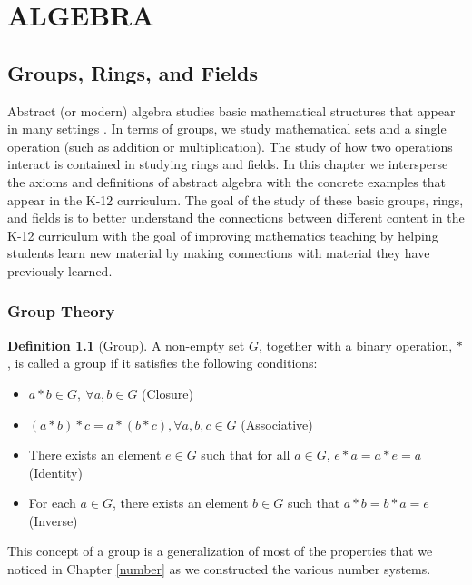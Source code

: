 \documentclass[
]{book}
\let\stdsection\section
\renewcommand\section{\newpage\stdsection}
\theoremstyle{definition}
\newtheorem{definition}{Definition}[chapter]
\theoremstyle{definition}
\theoremstyle{definition}
\theoremstyle{definition}
\theoremstyle{remark}
\begin{document}
\hypertarget{part-algebra}{%
\part{ALGEBRA}\label{part-algebra}}

\hypertarget{group-1}{%
\chapter{Groups, Rings, and Fields}\label{group-1}}

Abstract (or modern) algebra studies basic mathematical structures that appear in many settings . In terms of groups, we study mathematical sets and a single operation (such as addition or multiplication). The study of how two operations interact is contained in studying rings and fields. In this chapter we intersperse the axioms and definitions of abstract algebra with the concrete examples that appear in the K-12 curriculum. The goal of the study of these basic groups, rings, and fields is to better understand the connections between different content in the K-12 curriculum with the goal of improving mathematics teaching by helping students learn new material by making connections with material they have previously learned.

\hypertarget{groups}{%
\section{Group Theory}\label{groups}}

\begin{definition}[Group]

A non-empty set \(G\), together with a binary operation, \(*\), is called a group if it satisfies the following conditions:

\begin{itemize}
\item
  \(a*b \in G, \: \forall a,b \in G\) (Closure)
\item
  \((a*b)*c = a * (b*c), \forall a,b,c \in G\) (Associative)
\item
  There exists an element \(e \in G\) such that for all \(a\in G\), \(e*a=a*e=a\) (Identity)
\item
  For each \(a\in G\), there exists an element \(b\in G\) such that \(a*b=b*a=e\) (Inverse)
\end{itemize}

\end{definition}

This concept of a group is a generalization of most of the properties that we noticed in Chapter \ref{number} as we constructed the various number systems.
\end{document}
